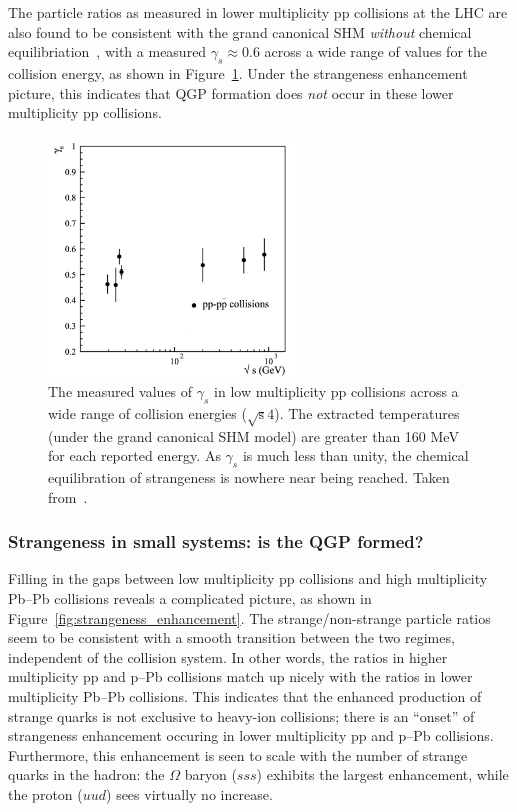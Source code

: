     \clearpage
 
 
 The particle ratios as measured in lower multiplicity pp collisions at the LHC are also found to be consistent with the grand canonical SHM \textit{without} chemical equilibriation~\cite{NATURE14, NATURE15}, with a measured $\gamma_s \approx 0.6$ across a wide range of values for the collision energy, as shown in Figure~\ref{fig:micro_model}. Under the strangeness enhancement picture, this indicates that QGP formation does \textit{not} occur in these lower multiplicity pp collisions. 

\begin{figure}[ht]
    \centering
    \includegraphics[width=0.6\textwidth]{figures/introduction/micro_model.png}
    \caption{The measured values of $\gamma_s$ in low multiplicity pp collisions across a wide range of collision energies ($\sqrt{\text{s}}4$). The extracted temperatures (under the grand canonical SHM model) are greater than 160 MeV for each reported energy. As $\gamma_s$ is much less than unity, the chemical equilibration of strangeness is nowhere near being reached. Taken from~\cite{NATURE14}.}
    \label{fig:micro_model}
\end{figure}

 \subsubsection{Strangeness in small systems: is the QGP formed?}

 Filling in the gaps between low multiplicity pp collisions and high multiplicity Pb--Pb collisions reveals a complicated picture, as shown in Figure~\ref{fig:strangeness_enhancement}. The strange/non-strange particle ratios seem to be consistent with a smooth transition between the two regimes, independent of the collision system. In other words, the ratios in higher multiplicity pp and p--Pb collisions match up nicely with the ratios in lower multiplicity Pb--Pb collisions. This indicates that the enhanced production of strange quarks is not exclusive to heavy-ion collisions; there is an ``onset'' of strangeness enhancement occuring in lower multiplicity pp and p--Pb collisions. Furthermore, this enhancement is seen to scale with the number of strange quarks in the hadron: the $\Omega$ baryon ($sss$) exhibits the largest enhancement, while the proton ($uud$) sees virtually no increase. 
 
